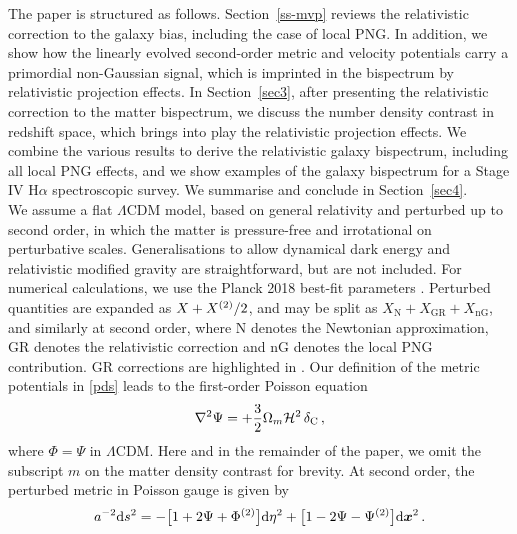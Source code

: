The paper is structured as follows. Section~\ref{ss-mvp} reviews the relativistic correction to the 
galaxy bias, including  the case of local PNG. In addition, we show how the linearly evolved second-order metric and velocity potentials carry a primordial non-Gaussian signal, which is imprinted in the bispectrum by relativistic projection effects. In Section~\ref{sec3}, after presenting the relativistic correction to the matter bispectrum, we discuss the number density contrast in redshift space, which brings into play the relativistic projection effects. We combine the various results to derive the relativistic galaxy bispectrum, including all local PNG effects, and we show examples of the galaxy bispectrum for a Stage IV H$\alpha$ spectroscopic survey. We summarise and conclude in Section~\ref{sec4}.
%
~\\  
%
We assume  a flat $\Lambda$CDM model, based on general relativity and perturbed up to second order, in which the matter is pressure-free and irrotational on perturbative scales. Generalisations to allow dynamical dark energy and relativistic modified gravity are straightforward, but are not included. For numerical calculations, we use the Planck 2018 best-fit parameters \cite{Aghanim:2018eyx}.
Perturbed quantities are expanded as
$X+X^{{(2)}}/2$, and may be split as  $X_{\mathrm{N}}+X_{\mathrm{GR}}+X_{\mathrm{nG}}$, 
and similarly at second order, where N denotes the Newtonian approximation, GR denotes the relativistic correction and  nG denotes the local PNG contribution. {GR corrections are highlighted in .}
%
Our definition of the metric potentials in \eqref{pds} leads to the first-order Poisson equation 
\begin{equation} \label{pe1}
\nabla^2 \Psi= + \frac{3}{2}\Omega_m{\cal H}^2\,\delta_{\mathrm{C}} \,,
\end{equation}
where  $ \Phi= \Psi$ in $\Lambda$CDM. Here and in the remainder of the paper, we omit the subscript $m$ on the matter density contrast for brevity.
At second order, the perturbed metric in Poisson gauge is given by
\begin{equation} \label{pds2}
a^{-2}\mathrm{d} s^2=-\big[1+2\Psi + \Phi^{{(2)}}\big]\mathrm{d} \eta^2+ \big[1-2\Psi -  \Psi^{{(2)}}\big]\mathrm{d} \bm {x}^2\,.
\end{equation}
%
%
%
